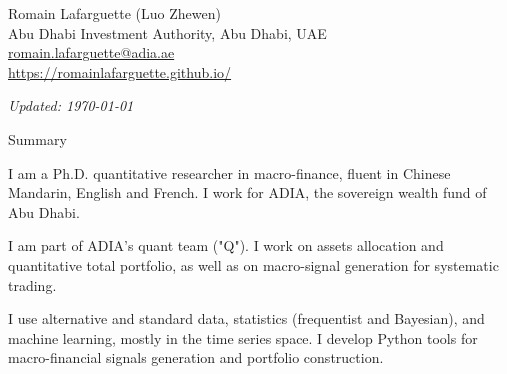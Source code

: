 \documentclass[usegeometry, 10pt, a4paper]{cv} %
\begin{document}
\hspace{10mm}
\begin{chapeau}
\begin{adresse}
\begin{flushleft}
    Romain Lafarguette (Luo Zhewen)\\
    Abu Dhabi Investment Authority, Abu Dhabi, UAE \\
    \href{mailto:romain.lafarguette@adia.ae}{romain.lafarguette@adia.ae}\\
    \url{https://romainlafarguette.github.io/} \\
\end{flushleft}
\end{adresse}
\begin{etatcivil}
\begin{flushleft}
  \hspace{15mm} \emph{Updated: \monthyeardate\today}\\
\end{flushleft}
\end{etatcivil}
\end{chapeau}

\begin{rubriquetableau}[0.95\textwidth]{Summary}\\
  \vspace{-0.5cm}
    
I  am a  Ph.D. quantitative  researcher  in macro-finance,  fluent in  Chinese
Mandarin, English  and French. I work  for ADIA, the sovereign  wealth fund of
Abu Dhabi.\\ \medskip

I  am part  of ADIA's  quant  team ("Q").   I  work on  assets allocation  and
quantitative  total  portfolio, as  well  as  on macro-signal  generation  for
systematic trading.\\ \medskip

I use  alternative and standard  data, statistics (frequentist  and Bayesian),
and machine learning, mostly in the time series space.  I develop Python tools
for macro-financial signals generation and portfolio construction. \\ 

\end{rubriquetableau}
\end{document}
